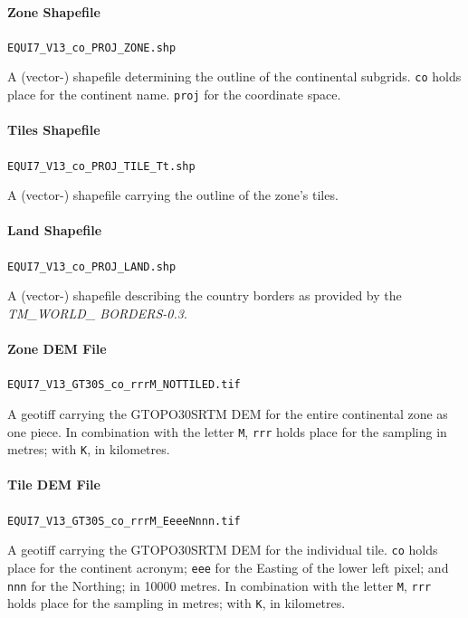 \documentclass[10pt,a4paper]{article}
\begin{document}
\paragraph{Zone Shapefile}
\texttt{EQUI7\_V13\_co\_PROJ\_ZONE.shp}

A (vector-) shapefile determining the outline of the continental subgrids. \texttt{co} holds place for the continent name. \texttt{proj} for the coordinate space.

\paragraph{Tiles Shapefile}
\texttt{EQUI7\_V13\_co\_PROJ\_TILE\_Tt.shp}

A (vector-) shapefile carrying the outline of the zone's tiles.

\paragraph{Land Shapefile}
\texttt{EQUI7\_V13\_co\_PROJ\_LAND.shp}

A (vector-) shapefile describing the country borders as provided by the \textit{TM\_WORLD\_ BORDERS-0.3}.

\paragraph{Zone DEM File}
\texttt{EQUI7\_V13\_GT30S\_co\_rrrM\_NOTTILED.tif}

A geotiff carrying the GTOPO30SRTM DEM for the entire continental zone as one piece. In combination with the letter \texttt{M}, \texttt{rrr} holds place for the sampling in metres; with \texttt{K}, in kilometres.

\paragraph{Tile DEM File}
\texttt{EQUI7\_V13\_GT30S\_co\_rrrM\_EeeeNnnn.tif}

A geotiff carrying the GTOPO30SRTM DEM for the individual tile. \texttt{co} holds place for the continent acronym; \texttt{eee} for the Easting of the lower left pixel; and \texttt{nnn} for the Northing; in 10000 metres. In combination with the letter \texttt{M}, \texttt{rrr} holds place for the sampling in metres; with \texttt{K}, in kilometres.
\end{document}
